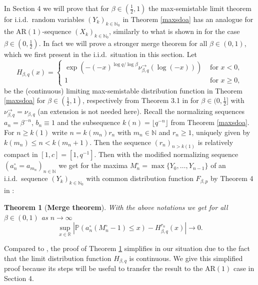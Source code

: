 \documentclass[12pt]{amsart}
\newtheorem{theorem}{Theorem}[section]
\theoremstyle{definition}
\theoremstyle{remark}
\newcommand{\rr}{{\mathbb R}}
\newcommand{\nat}{{\mathbb N}}
\newcommand{\AR}{\operatorname{AR(1)}}
\newcommand{\Pm}{{\mathbb P}}
\numberwithin{equation}{section}
\begin{document}
In Section 4 we will prove that for $\beta\in(\frac12,1)$ the max-semistable limit theorem for i.i.d.\ random variables $(Y_{k})_{k\in\nat_{0}}$ in Theorem \ref{maxsdoa} has an analogue for the $\AR$-sequence $(X_{k})_{k\in\nat_{0}}$, similarly to what is shown in \cite{Sterk} for the case $\beta\in(0,\frac12)$. In fact we will prove a stronger merge theorem for all $\beta\in(0,1)$, which we first present in the i.i.d.\ situation in this section. Let
\begin{equation}
H_{\beta,q}(x)=\begin{cases}\exp\left(-(-x)^{\log q/\log\beta}\nu_{\beta,q}^{\to}(\log(-x))\right) & \text{ for }x<0,\\
1 & \text{ for }x\geq0, \end{cases}
\end{equation}
be the (continuous) limiting max-semistable distribution function in Theorem \ref{maxsdoa} for $\beta\in(\frac12,1)$, respectively from Theorem 3.1 in \cite{Sterk} for $\beta\in(0,\frac12]$ with $\nu_{\beta,q}^{\to}=\nu_{\beta,q}$ (an extension is not needed here). Recall the normalizing sequences $a_{n}=\beta^{-n}$, $b_{n}\equiv1$ and the subsequence $k(n)=\lfloor q^{-n}\rfloor$ from Theorem \ref{maxsdoa}. For $n\geq k(1)$ write $n=k(m_{n})r_{n}$ with $m_{n}\in\nat$ and $r_{n}\geq1$, uniquely given by $k(m_{n})\leq n<k(m_{n}+1)$. Then the sequence $(r_{n})_{n>k(1)}$ is relatively compact in $[1,c]=[1,q^{-1}]$. Then with the modified normalizing sequence $(a_{n}^{\circ}=a_{m_{n}})_{n\in\nat}$ we get for the maxima $M_{n}^{\circ}=\max\{Y_{0},\ldots,Y_{n-1}\}$ of an i.i.d.\ sequence $(Y_{k})_{k\in\nat_{0}}$ with common distribution function $F_{\beta,p}$ by Theorem 4 in \cite{Megyesi}:

\begin{theorem}[\bf Merge theorem]\label{merge}
With the above notations we get for all $\beta\in(0,1)$ as $n\to\infty$
\begin{equation}\label{mergecomp}
\sup_{x\in\rr}\left|\Pm\left(a_{n}^{\circ}(M_{n}^{\circ}-1)\leq x\right)-H^{r_{n}}_{\beta,q}(x)\right|\to0.
\end{equation}
\end{theorem}

Compared to \cite{Megyesi}, the proof of Theorem \ref{merge} simplifies in our situation due to the fact that the limit distribution function $H_{\beta,q}$ is continuous. We give this simplified proof because its steps will be useful to transfer the result to the $\AR$ case in Section 4.
\end{document}

